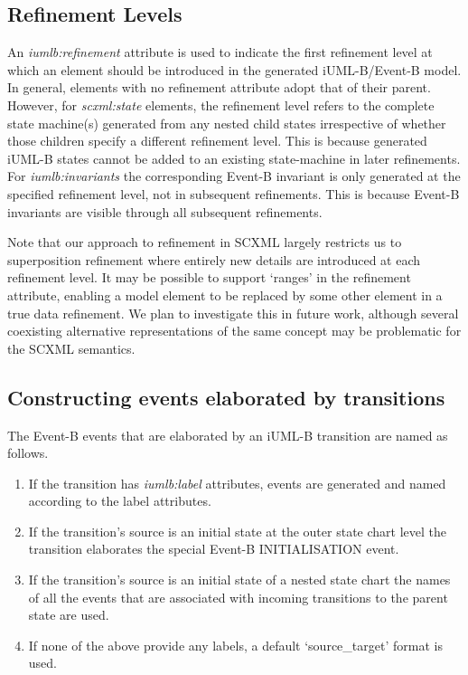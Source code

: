 \subsection{Refinement Levels}
An \emph{iumlb:refinement} attribute is used to indicate the first refinement 
level at which an element should be introduced in the generated iUML-B/Event-B model. 
In general, elements with no refinement attribute adopt that of their parent.  
However, for \emph{scxml:state} elements, the refinement level refers to the complete state 
machine(s) generated from any nested child states irrespective of whether 
those children specify a different refinement level. This is because generated 
iUML-B states cannot be added to an existing state-machine in later refinements.
For \emph{iumlb:invariants} the corresponding Event-B invariant is only  generated at the 
specified refinement level, not in  subsequent refinements. This is because Event-B 
invariants are visible through all subsequent refinements.

Note that our approach to refinement in SCXML largely restricts us to superposition 
refinement where entirely new details are introduced at each refinement level.  
It may be possible to support `ranges' in the refinement attribute, enabling a model 
element to be replaced by some other element in a true data refinement. We plan to 
investigate this in future work, although several coexisting alternative 
representations of the same concept may be problematic for the SCXML semantics.

\subsection{Constructing events elaborated by transitions}
The Event-B events that are elaborated by an iUML-B  transition are named as follows. 

\vspace{-\topsep}
\begin{enumerate}
  \setlength{\parskip}{0pt}
  \setlength{\itemsep}{0pt plus 1pt}
\item If the transition has \emph{iumlb:label} attributes, events are generated 
and named according to the label attributes.
\item If the transition's source is an initial state at the outer state chart 
level the transition elaborates the special Event-B INITIALISATION event. 
\item If the transition's source is an initial state of a nested state chart 
the names of all the events that are associated with incoming transitions to 
the parent state are used.
\item If none of the above provide any labels, a default  `source\_target' format is used.
\end{enumerate}
\vspace{-\topsep}

